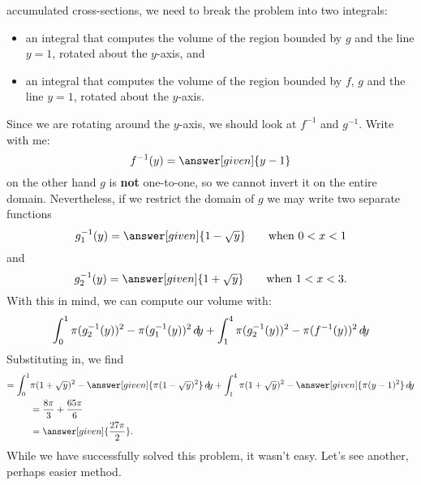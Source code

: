 \documentclass{ximera}
\begin{document}
accumulated cross-sections, we need to break the problem into two
integrals:
\begin{itemize}
  \item an integral that computes the volume of the region bounded by
    $g$ and the line $y=1$, rotated about the $y$-axis, and
  \item an integral that computes the volume of the region bounded by
    $f$, $g$ and the line $y=1$, rotated about the $y$-axis.
\end{itemize}
Since we are rotating around the $y$-axis, we should look at $f^{-1}$
and $g^{-1}$. Write with me:
\[
f^{-1}(y) = \answer[given]{y-1}
\]
on the other hand $g$ is \textbf{not} one-to-one, so
we cannot invert it on the entire domain. Nevertheless, if we restrict
the domain of $g$ we may write two separate functions
\[
g^{-1}_1(y) = \answer[given]{1-\sqrt{y}}\qquad\text{when $0<x<1$}
\]
and
\[
g^{-1}_2(y) = \answer[given]{1+\sqrt{y}}\qquad\text{when $1<x<3$}.
\]
With this in mind, we can compute our volume with:
\[
\int_0^1 \pi(g^{-1}_2(y))^2-\pi(g_1^{-1}(y))^2\mathop{}\!d\! y+ \int_1^4
\pi(g^{-1}_2(y))^2-\pi(f^{-1}(y))^2\mathop{}\!d\! y
\]
Substituting in, we find
  \begin{align*}
  =\int_0^1 &\pi(1+\sqrt{y})^2-\answer[given]{\pi(1-\sqrt{y})^2}\d y+
  \int_1^4  \pi(1+\sqrt{y})^2-\answer[given]{\pi(y-1)^2}\d y\\
  &=\frac{8\pi}{3} + \frac{65\pi}{6}\\
  &=\answer[given]{\frac{27\pi}{2}}.
\end{align*}
While we have successfully solved this problem, it wasn't easy. Let's
see another, perhaps easier method.
\end{document}

